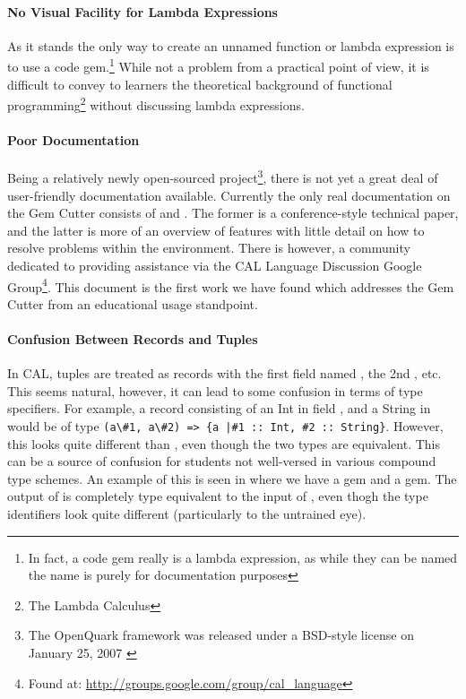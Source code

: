 \paragraph{No Visual Facility for Lambda Expressions}

As it stands the only way to create an unnamed function or lambda expression is to use a code gem.\footnote{In fact, a code gem really is a lambda expression, as while they can be named the name is purely for documentation purposes}  While not a problem from a practical point of view, it is difficult to convey to learners the theoretical background of functional programming\footnote{The Lambda Calculus} without discussing lambda expressions.

\paragraph{Poor Documentation}

Being a relatively newly open-sourced project\footnote{The OpenQuark framework was released under a BSD-style license on January 25, 2007 \cite{bobjNews}}, there is not yet a great deal of user-friendly documentation available.  Currently the only real documentation on the Gem Cutter consists of \cite{evans07} and \cite{evans06}.  The former is a conference-style technical paper, and the latter is more of an overview of features with little detail on how to resolve problems within the environment.  There is however, a community dedicated to providing assistance via the CAL Language Discussion Google Group\footnote{Found at: \url{http://groups.google.com/group/cal_language}}.  This document is the first work we have found which addresses the Gem Cutter from an educational usage standpoint.

\paragraph{Confusion Between Records and Tuples}

In CAL, tuples are treated as records with the first field named , the 2nd , etc.  This seems natural, however, it can lead to some confusion in terms of type specifiers.  For example, a record consisting of an Int in field , and a String in  would be of type \verb!(a\#1, a\#2) => {a |#1 :: Int, #2 :: String}!.  However, this looks quite different than , even though the two types are equivalent.  This can be a source of confusion for students not well-versed in various compound type schemes.  An example of this is seen in  where we have a  gem and a  gem.  The output of  is completely type equivalent to the input of , even thogh the type identifiers look quite different (particularly to the untrained eye).

